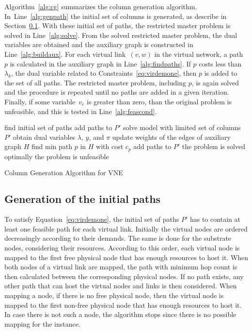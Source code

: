 \documentclass{llncs}
\begin{document}
Algorithm~\ref{alg:cg} summarizes the column generation algorithm. In~Line~\ref{alg:genpath} the initial set of columns is generated, as describe in Section~\ref{sec:initialCol}. With these initial set of paths, the restricted master problem is solved in Line~\ref{alg:solve}. From the solved restricted master problem, the dual variables are obtained and the auxiliary graph is constructed in Line~\ref{alg:buildaux}. For each virtual link~$(v,w)$ in the virtual network, a path $p$ is calculated in the auxiliary graph in Line~\ref{alg:findpaths}. If $p$ costs less than $\lambda_{k}$, the dual variable related to Constraints~\eqref{eq:virdemone}, then $p$ is added to the set of all paths. The restricted master problem, including $p$, is again solved and the procedure is repeated until no paths are added in a given iteration. 
Finally, if some variable~$v_{e}$ is greater than zero, than the original problem is unfeasible, and this is tested in Line~\ref{alg:feascond}.
\begin{algorithm}
find initial set of paths\; \label{alg:genpath}
  {add paths to $P'$\;
  solve model with limited set of columns $P'$\; \label{alg:solve}
  obtain dual variables $\lambda$, $y$, and $\pi$\; 
  update weights of the edges of auxiliary graph $H$\; \label{alg:buildaux}
    {find min path $p$ in $H$ with cost $c_{p}$\; \label{alg:findpaths}
      {add paths to $P'$\;}
    }
  }
  {the problem is solved optimally\;}
  {the problem is unfeasible\;}
\caption{Column Generation Algorithm for VNE}
\label{alg:cg}
\end{algorithm}

\subsection{Generation of the initial paths}\label{sec:initialCol}
To satisfy Equation~\ref{eq:virdemone}, the initial set of paths $P'$ has to contain at least one feasible path for each virtual link.
Initially the virtual nodes are ordered decreasingly according to their demands. The same is done for the substrate nodes, considering their resources.
According to this order, each virtual node is mapped to the first free physical node that has enough resources to host it.
When both nodes of a virtual link are mapped, the path with minimum hop count is then calculated between the corresponding physical nodes.
If no path exists, any other path that can host the virtual nodes and links is then considered.
When mapping a node, if there is no free physical node, then the virtual node is mapped to the first non-free physical node that has enough resources to host it.
In case there is not such a node, the algorithm stops since there is no possible mapping for the instance.
\end{document}
